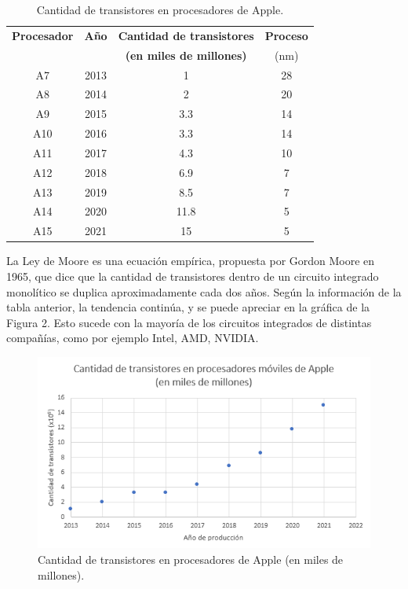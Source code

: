 \begin{table}[H]
    \centering
    \caption{Cantidad de transistores en procesadores de Apple.}
    \label{tabla_ley_moore}
    \begin{tabular}{|c|c|c|c|}
        \hline \textbf{Procesador} & \textbf{Año} & \textbf{Cantidad de transistores}  & \textbf{Proceso} \\
         & & \textbf{(en miles de millones)} & (nm) \\
        \hline A7 & 2013 & 1 & 28 \\
        A8 & 2014 & 2 & 20 \\
        A9 & 2015 & 3.3 & 14 \\
        A10 & 2016 & 3.3 & 14 \\
        A11 & 2017 & 4.3 & 10 \\
        A12 & 2018 & 6.9 & 7 \\
        A13 & 2019 & 8.5 & 7 \\
        A14 & 2020 & 11.8 & 5 \\
        A15 & 2021 & 15 & 5 \\
        \hline
    \end{tabular}
\end{table}

La Ley de Moore \cite{moore1965} es una ecuación empírica, propuesta por Gordon Moore en 1965, que dice que la cantidad de transistores dentro de un circuito integrado monolítico se duplica aproximadamente cada dos años. Según la información de la tabla anterior, la tendencia continúa, y se puede apreciar en la gráfica de la Figura 2. Esto sucede con la mayoría de los circuitos integrados de distintas compañías, como por ejemplo Intel, AMD, NVIDIA. 

\begin{figure}[H]
\centering
\includegraphics{figuras/ley_moore_apple.png}
\caption{Cantidad de transistores en procesadores de Apple (en miles de millones).}
\label{ley_moore_apple}
\end{figure}

